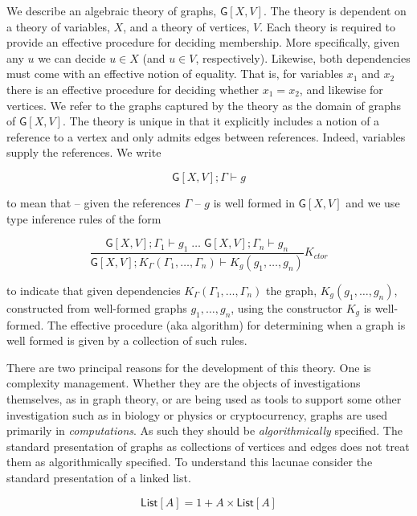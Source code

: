\documentclass[12pt]{llncs}
\begin{document}
\lstset{language=[Objective]Caml,frame=shadowbox}




We describe an algebraic theory of graphs, \(\mathsf{G}[X,V]\). The
theory is dependent on a theory of variables, \(X\), and a theory of
vertices, \(V\). Each theory is required to provide an effective
procedure for deciding membership. More specifically, given any \(u\) we
can decide \(u \in X\) (and \(u \in V\), respectively). Likewise, both
dependencies must come with an effective notion of equality. That is,
for variables \(x_1\) and \(x_2\) there is an effective procedure for
deciding whether \(x_1 = x_2\), and likewise for vertices. We refer to
the graphs captured by the theory as the domain of graphs of
\(\mathsf{G}[X,V]\). The theory is unique in that it explicitly includes
a notion of a reference to a vertex and only admits edges between
references. Indeed, variables supply the references. We write

\[\mathsf{G}[X,V];\Gamma \vdash g\]

to mean that -- given the references \(\Gamma\) -- \(g\) is well formed
in \(\mathsf{G}[X,V]\) and we use type inference rules of the form

\[\frac{ \mathsf{G}[X,V]; \Gamma_1 \vdash g_1 \; \ldots \; \mathsf{G}[X,V]; \Gamma_n \vdash g_n}{ \mathsf{G}[X,V]; K_{\Gamma}(\Gamma_1,\ldots,\Gamma_n) \vdash K_g(g_1,\ldots, g_n)}K_{ctor}\]

to indicate that given dependencies
\(K_{\Gamma}(\Gamma_1,\ldots,\Gamma_n)\) the graph,
\(K_g(g_1,\ldots,g_n)\), constructed from well-formed graphs
\(g_1,\ldots,g_n\), using the constructor \(K_g\) is well-formed. The
effective procedure (aka algorithm) for determining when a graph is well
formed is given by a collection of such rules.

There are two principal reasons for the development of this theory. One
is complexity management. Whether they are the objects of investigations
themselves, as in graph theory, or are being used as tools to
support some other investigation such as in biology or physics or
cryptocurrency, graphs are used primarily in \emph{computations}. As
such they should be \emph{algorithmically} specified. The standard
presentation of graphs as collections of vertices and edges does not
treat them as algorithmically specified. To understand this lacunae
consider the standard presentation of a linked list.

\[\mathsf{List}[A] = 1 + A \times \mathsf{List}[A]\]
\end{document}
